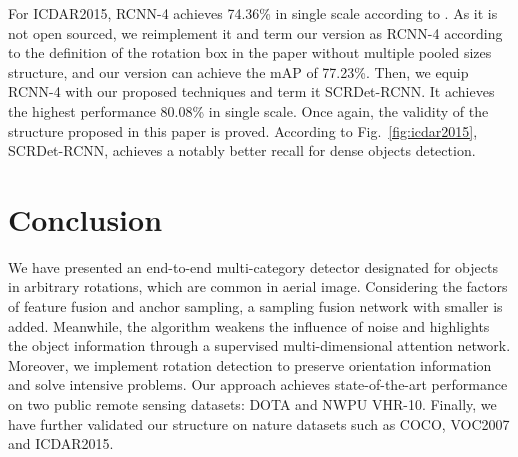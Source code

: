 \documentclass[10pt,twocolumn,letterpaper]{article}
\begin{document}
	For ICDAR2015, RCNN-4 achieves 74.36\% in single scale according to \cite{jiang2017r2cnn}. As it is not open sourced, we reimplement it and term our version as RCNN-4 according to the definition of the rotation box in the paper without multiple pooled sizes structure, and our version can achieve the mAP of 77.23\%. Then, we equip RCNN-4 with our proposed techniques and term it SCRDet-RCNN. It achieves the highest performance 80.08\% in single scale. Once again, the validity of the structure proposed in this paper is proved. According to Fig.~\ref{fig:icdar2015}, SCRDet-RCNN, achieves a notably better recall for dense objects detection. 
	\begin{table}[]
		\centering
		\vspace{-10pt}
		\caption{Effectiveness of the proposed structure on generic datasets. Notation  indicates our own implementation. For VOC 2007, all methods are trained on VOC2007 trainval sets and tested on VOC 2007 test set. For COCO, all the results are obtained on the  set. For ICDAR2015, results are obtained by submitting it to the official website.}
		\label{table:experiments}
	\end{table}
	
	\section{Conclusion}
	We have presented an end-to-end multi-category detector designated for objects in arbitrary rotations, which are common in aerial image. Considering the factors of feature fusion and anchor sampling, a sampling fusion network with smaller  is added. Meanwhile, the algorithm weakens the influence of noise and highlights the object information through a supervised multi-dimensional attention network. Moreover, we implement rotation detection to preserve orientation information and solve intensive problems. Our approach achieves state-of-the-art performance on two public remote sensing datasets: DOTA and NWPU VHR-10. Finally, we have further validated our structure on nature datasets such as COCO, VOC2007 and ICDAR2015.
	
	{\small
		
		
	}
	
\end{document}
